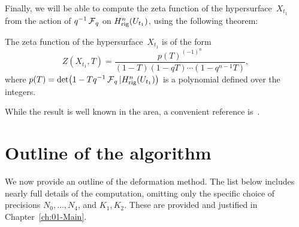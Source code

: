 Finally, we will be able to compute the zeta function of the 
hypersurface~$X_{t_1}$ from the action of $q^{-1} \operatorname{\mathcal{F}}_q$ on 
$H_{\text{rig}}^{n}(U_{t_1})$, using the following theorem:

\begin{thm}
The zeta function of the hypersurface~$X_{t_1}$ is of the form
\begin{equation*}
Z(X_{t_1},T) = \frac{p(T)^{(-1)^n}}{(1 - T) (1 - qT) \dotsm (1 - q^{n-1}T)},
\end{equation*}
where $p(T) = \det \bigl( 1 - T q^{-1} \operatorname{\mathcal{F}}_q | H_{\text{rig}}^n(U_{t_1}) \bigr)$ 
is a polynomial defined over the integers.
\end{thm}

While the result is well known in the area, a convenient reference 
is~\citep[Theorem~3.1]{Gerkmann2007}.


\section{Outline of the algorithm}

We now provide an outline of the deformation method.  The list below 
includes nearly full details of the computation, omitting only the 
specific choice of precisions $N_0, \dotsc, N_4$, and $K_1, K_2$.  
These are provided and justified in Chapter~\ref{ch:01-Main}.

